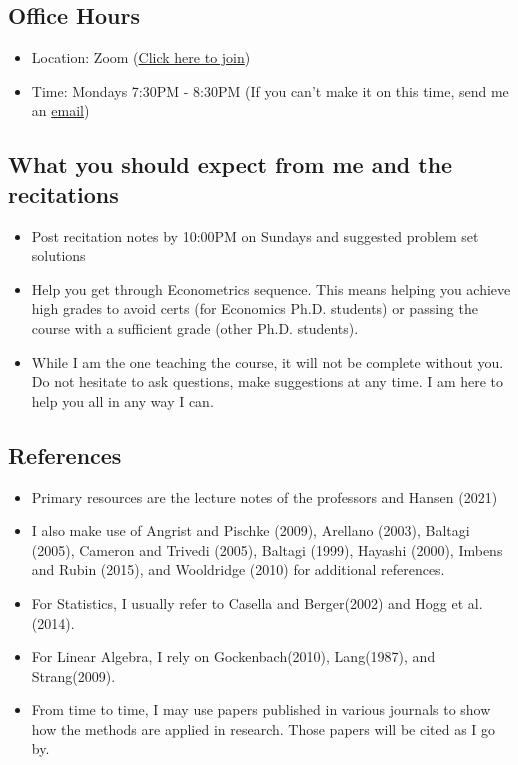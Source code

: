 \documentclass[12pt]{article}
\theoremstyle{definition}
\theoremstyle{property}
\theoremstyle{assumption}
\theoremstyle{example}
\theoremstyle{comment}
\begin{document}
\subsection{Office Hours}
\begin{itemize}
\item Location: Zoom (\href{https://columbiauniversity.zoom.us/j/96949225512?pwd=bTgwKytIVHpmNVloU0hNOEFxQ3J3UT09}{Click here to join})
\item Time: Mondays 7:30PM - 8:30PM (If you can't make it on this time, send me an \href{mailto:sl4436@columbia.edu}{email})
\end{itemize}
\subsection{What you should expect from me and the recitations}
\begin{itemize}
\item Post recitation notes by 10:00PM on Sundays and suggested problem set solutions
\item Help you get through Econometrics sequence. This means helping you achieve high grades to avoid certs (for Economics Ph.D. students) or  passing the course with a sufficient grade (other Ph.D. students).  
\item While I am the one teaching the course, it will not be complete without you. Do not hesitate to ask questions, make suggestions at any time. I am here to help you all in any way I can. 
\end{itemize}
\subsection{References}
\begin{itemize}
\item Primary resources are the lecture notes of the professors and  Hansen (2021)
\item I also make use of Angrist and Pischke (2009), Arellano (2003), Baltagi (2005), Cameron and Trivedi (2005), Baltagi (1999), Hayashi (2000), Imbens and Rubin (2015), and Wooldridge (2010) for additional references.
\item For Statistics, I usually refer to Casella and Berger(2002) and Hogg et al.(2014).
\item For Linear Algebra, I rely on Gockenbach(2010), Lang(1987), and Strang(2009).
\item From time to time, I may use papers published in various journals to show how the methods are applied in research. Those papers will be cited as I go by. 
\end{itemize}
\end{document}
